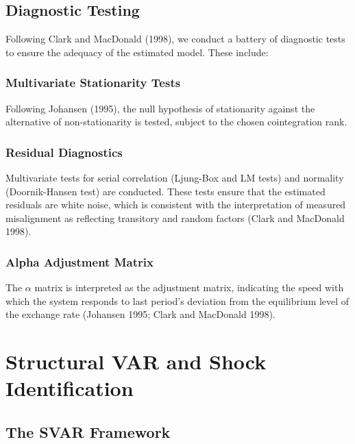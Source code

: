 \documentclass[
  manuscript=article,
  layout=publish,
  year=2026,
  volume=6,
]{den}
\begin{document}
\subsection{Diagnostic Testing}\label{diagnostic-testing}

Following Clark and MacDonald (1998), we conduct a battery of diagnostic
tests to ensure the adequacy of the estimated model. These include:

\subsubsection{Multivariate Stationarity
Tests}\label{multivariate-stationarity-tests}

Following Johansen (1995), the null hypothesis of stationarity against
the alternative of non-stationarity is tested, subject to the chosen
cointegration rank.

\subsubsection{Residual Diagnostics}\label{residual-diagnostics}

Multivariate tests for serial correlation (Ljung-Box and LM tests) and
normality (Doornik-Hansen test) are conducted. These tests ensure that
the estimated residuals are white noise, which is consistent with the
interpretation of measured misalignment as reflecting transitory and
random factors (Clark and MacDonald 1998).

\subsubsection{Alpha Adjustment Matrix}\label{alpha-adjustment-matrix}

The \(\alpha\) matrix is interpreted as the adjustment matrix,
indicating the speed with which the system responds to last period's
deviation from the equilibrium level of the exchange rate (Johansen
1995; Clark and MacDonald 1998).

\section{Structural VAR and Shock
Identification}\label{structural-var-and-shock-identification}

\subsection{The SVAR Framework}\label{the-svar-framework}
\end{document}
